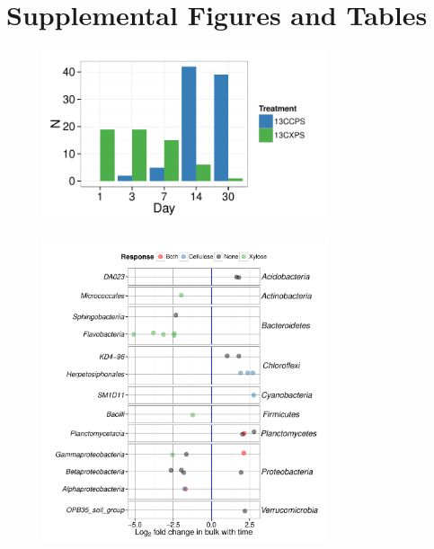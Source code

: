 \thispagestyle{empty}


\section{Supplemental Figures and Tables}

\begin{figure}[H]
	\begin{center}
	\centerline{\includegraphics[width=0.75\textwidth]{figures/all_rspndr_bar/all_rspndr_bar.pdf}}
	\caption{\protect}\label{fig:rspndr_count}
        \end{center}
\end{figure}

\begin{figure}[H] \begin{center}
\centerline{\includegraphics[width=0.75\textwidth]{figures/l2fc_time/l2fc_time.pdf}}
\caption{\protect}\label{fig:time}
\end{center} \end{figure}

